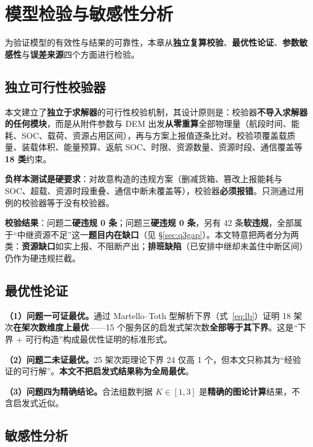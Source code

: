 \section{模型检验与敏感性分析}

为验证模型的有效性与结果的可靠性，本章从\textbf{独立复算校验}、\textbf{最优性论证}、\textbf{参数敏感性}与\textbf{误差来源}四个方面进行检验。

\subsection{独立可行性校验器}\label{sec:verify}

本文建立了\textbf{独立于求解器}的可行性校验机制，其设计原则是：校验器\textbf{不导入求解器的任何模块}，而是从附件参数与 DEM 出发\textbf{从零重算}全部物理量（航段时间、能耗、SOC、载荷、资源占用区间），再与方案上报值逐条比对。校验项覆盖载质量、装载体积、能量预算、返航 SOC、时限、资源数量、资源时段、通信覆盖等 \textbf{18 类}约束。

\textbf{负样本测试是硬要求}：对故意构造的违规方案（删减货箱、篡改上报能耗与 SOC、超载、资源时段重叠、通信中断未覆盖等），校验器\textbf{必须报错}。只测通过用例的校验器等于没有校验器。

\textbf{校验结果}：问题二\textbf{硬违规 0 条}；问题三\textbf{硬违规 0 条}，另有 42 条\textbf{软违规}，全部属于“中继资源不足”这一\textbf{题目内在缺口}（见 \S\ref{sec:q3gap}）。本文特意把两者分为两类：\textbf{资源缺口}如实上报、不阻断产出；\textbf{排班缺陷}（已安排中继却未盖住中断区间）仍作为硬违规拦截。

\subsection{最优性论证}

\textbf{（1）问题一可证最优。}通过 Martello--Toth 型解析下界（式~\eqref{eq:lb}）证明 18 架次\textbf{在架次数维度上最优}——15 个服务区的启发式架次数\textbf{全部等于其下界}。这是“下界 $+$ 可行构造”构成最优性证明的标准形式。

\textbf{（2）问题二未证最优。}25 架次距理论下界 24 仅高 1 个，但本文只称其为“经验证的可行解”。\textbf{本文不把启发式结果称为全局最优}。

\textbf{（3）问题四为精确结论。}合法组数判据 $K\in[1,3]$ 是\textbf{精确的图论计算}结果，不含启发式近似。

\subsection{敏感性分析}

